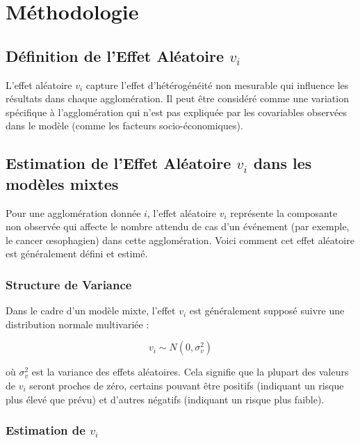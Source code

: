 \documentclass[
]{article}
\author{}
\date{\vspace{-2.5em}}
\begin{document}
\section{Méthodologie}\label{muxe9thodologie}

\subsection{\texorpdfstring{Définition de l'Effet Aléatoire
\(v_i\)}{Définition de l'Effet Aléatoire v\_i}}\label{duxe9finition-de-leffet-aluxe9atoire-v_i}

L'effet aléatoire \(v_i\) capture l'effet d'hétérogénéité non mesurable
qui influence les résultats dans chaque agglomération. Il peut être
considéré comme une variation spécifique à l'agglomération qui n'est pas
expliquée par les covariables observées dans le modèle (comme les
facteurs socio-économiques).

\subsection{\texorpdfstring{Estimation de l'Effet Aléatoire \(v_i\) dans
les modèles
mixtes}{Estimation de l'Effet Aléatoire v\_i dans les modèles mixtes}}\label{estimation-de-leffet-aluxe9atoire-v_i-dans-les-moduxe8les-mixtes}

Pour une agglomération donnée \(i\), l'effet aléatoire \(v_i\)
représente la composante non observée qui affecte le nombre attendu de
cas d'un événement (par exemple, le cancer œsophagien) dans cette
agglomération. Voici comment cet effet aléatoire est généralement défini
et estimé.

\subsubsection{Structure de Variance}\label{structure-de-variance}

Dans le cadre d'un modèle mixte, l'effet \(v_i\) est généralement
supposé suivre une distribution normale multivariée :

\[
v_i \sim N(0, \sigma_v^2)
\]

où \(\sigma_v^2\) est la variance des effets aléatoires. Cela signifie
que la plupart des valeurs de \(v_i\) seront proches de zéro, certains
pouvant être positifs (indiquant un risque plus élevé que prévu) et
d'autres négatifs (indiquant un risque plus faible).

\subsubsection{\texorpdfstring{Estimation de
\(v_i\)}{Estimation de v\_i}}\label{estimation-de-v_i}
\end{document}
